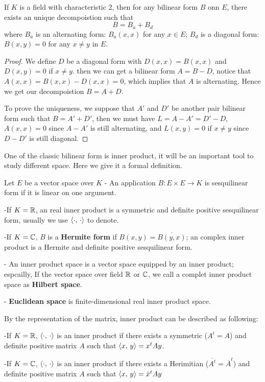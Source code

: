 \documentclass[en,geye,blue,normal,12pt]{elegantnote}
\begin{document}
\begin{proposition}
  If \(K\) is a field with characteristic 2, then for any bilinear form \(B\) onn \(E\), there exists an unique decompoistion such that
  \[B = B_a + B_d\]
  where \(B_a\) is an alternating form: \(B_a(x,x)\) for any \(x \in E\); \(B_d\) is a diagonal form: \(B(x,y) = 0\) for any \(x\neq y\) in \(E\).

  \begin{proof}
    We define \(D\) be a diagonal form with \(D(x,x) = B(x,x)\) and \(D(x,y) = 0\) if \(x \neq y\). then we can get a bilinear form \(A = B-D\), notice that \(A(x,x) = B(x,x)-D(x,x) = 0\), which implies that \(A\) is alternating. Hence we get our decompoistion \(B = A+D\).

    To prove the uniqueness, we suppose that \(A'\) and \(D'\) be another pair bilinear form such that \(B=A'+D'\), then we must have \(L=A-A'=D'-D\), \(A(x,x) = 0 \) since \(A-A'\) is still alternating, and \(L(x,y) = 0\) if \(x\neq  y\) since \(D-D'\) is still diagonal.

  \end{proof}
\end{proposition}

One of the classic bilinear form is inner product, it will be an important tool to study different space. Here we give it a formal definition.

\begin{definition}
  Let \(E\) be a vector space over \(K\)
  - An application \(B:E\times E \to K\) is sesquilinear form if it is linear on one argument.

  -If \(K = \mathbb{R}\), an real inner product is a symmetric and definite positive sesquilinear form, usually we use \(\left\langle \cdot,\, \cdot \right\rangle\) to denote.

  -If \(K = \mathbb{C}\), \(B\) is a \textbf{Hermite form} if \(B(x,y) = \overline{B(y,x)}\); an complex inner product is a Hermite and definite positive sesquilinear form.

  - An inner product space is a vector space equipped by an inner product; espcailly, If the vector space over field \(\mathbb{R}\) or \(\mathbb{C}\), we call a complet inner product space as \textbf{Hilbert space}.

  - \textbf{Euclidean space} is finite-dimensional real inner product space.
\end{definition}

\begin{remark}
  By the representation of the matrix, inner product can be described as following:

  -If \(K = \mathbb{R}\), \(\left\langle \cdot,\, \cdot \right\rangle\) is an inner product if there exists a symmetric (\(A^t=A\)) and definite positive matrix \(A\) such that \(\left\langle x,\, y \right\rangle = x^tAy\).

  -If \(K = \mathbb{C}\), \(\left\langle \cdot,\, \cdot \right\rangle\) is an inner product if there exists a Herimitian (\(\overline{A^t} = \overline{A}^t\)) and definite positive matrix \(A\) such that \(\left\langle x,\, y \right\rangle = \bar{x}^tAy\)
\end{remark}
\end{document}
